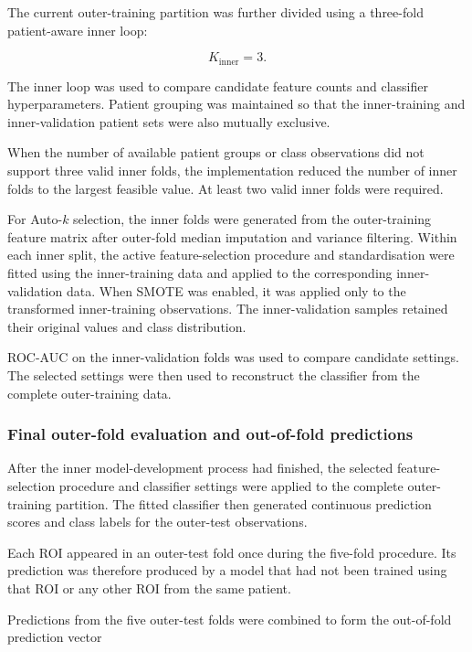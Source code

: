 \documentclass[12pt,twocolumn]{article}
\begin{document}
The current outer-training partition was further divided using a
three-fold patient-aware inner loop:

\begin{equation}
K_{\mathrm{inner}}=3.
\label{eq:inner_folds}
\end{equation}

The inner loop was used to compare candidate feature counts and
classifier hyperparameters. Patient grouping was maintained so that
the inner-training and inner-validation patient sets were also
mutually exclusive.

When the number of available patient groups or class observations did
not support three valid inner folds, the implementation reduced the
number of inner folds to the largest feasible value. At least two valid
inner folds were required.

For Auto-\(k\) selection, the inner folds were generated from the
outer-training feature matrix after outer-fold median imputation and
variance filtering. Within each inner split, the active
feature-selection procedure and standardisation were fitted using the
inner-training data and applied to the corresponding inner-validation
data.
When SMOTE was enabled, it was applied only to
the transformed inner-training observations. The inner-validation
samples retained their original values and class distribution.

ROC-AUC on the inner-validation folds was used to compare candidate
settings. The selected settings were then used to reconstruct the
classifier from the complete outer-training data.

\subsubsection{Final outer-fold evaluation and out-of-fold predictions}
\label{subsubsec:oof_predictions}

After the inner model-development process had finished, the selected
feature-selection procedure and classifier settings were applied to
the complete outer-training partition. The fitted classifier then
generated continuous prediction scores and class labels for the
outer-test observations.

Each ROI appeared in an outer-test fold once during the five-fold
procedure. Its prediction was therefore produced by a model that had
not been trained using that ROI or any other ROI from the same
patient.

Predictions from the five outer-test folds were combined to form the
out-of-fold prediction vector
\end{document}

